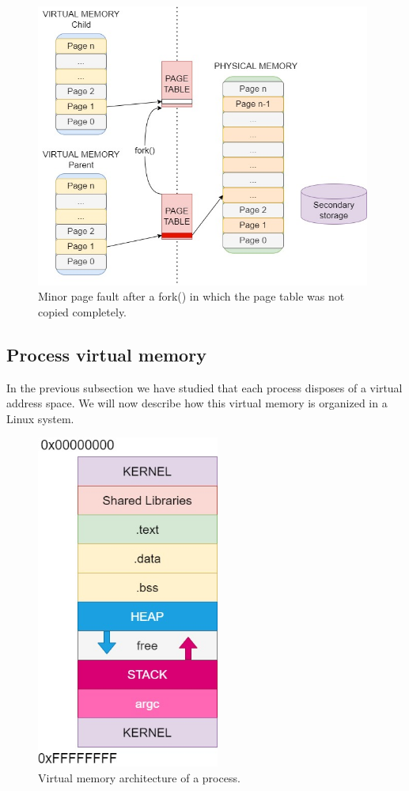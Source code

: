\documentclass[12pt]{report} %
\begin{document}
\begin{figure}[H]
	\centering
	\includegraphics[width=11cm]{mem_minor_page_fault.jpg}
	\caption{Minor page fault after a fork() in which the page table was not copied completely.}
	\label{fig:mem_minor_page_fault}
\end{figure}

\subsection{Process virtual memory}
In the previous subsection we have studied that each process disposes of a virtual address space. We will now describe how this virtual memory is organized in a Linux system.

\begin{figure}[H]
	\centering
	\includegraphics[width=6cm]{memory.jpg}
	\caption{Virtual memory architecture of a process\cite{mem_arch_proc}.}
	\label{fig:mem_proc_arch}
\end{figure}
\end{document}

